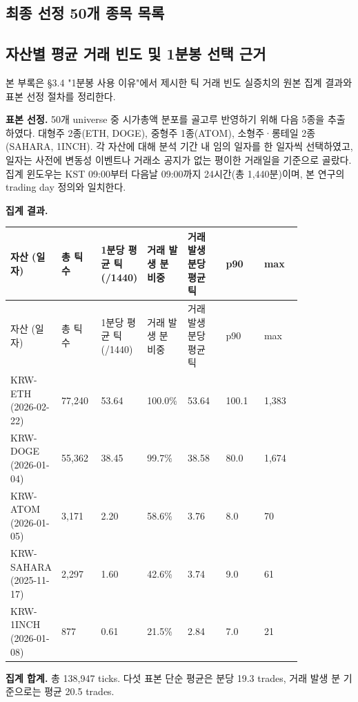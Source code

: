 \documentclass[12pt,a4paper]{article}
\begin{document}
\subsection{최종 선정 50개 종목 목록}


\subsection{자산별 평균 거래 빈도 및 1분봉 선택 근거}

본 부록은 \S{}3.4 "1분봉 사용 이유"에서 제시한 틱 거래 빈도 실증치의 원본 집계 결과와 표본 선정 절차를 정리한다.

\textbf{표본 선정.} 50개 universe 중 시가총액 분포를 골고루 반영하기 위해 다음 5종을 추출하였다. 대형주 2종(ETH, DOGE), 중형주 1종(ATOM), 소형주·롱테일 2종(SAHARA, 1INCH). 각 자산에 대해 분석 기간 내 임의 일자를 한 일자씩 선택하였고, 일자는 사전에 변동성 이벤트나 거래소 공지가 없는 평이한 거래일을 기준으로 골랐다. 집계 윈도우는 KST 09:00부터 다음날 09:00까지 24시간(총 1,440분)이며, 본 연구의 trading day 정의와 일치한다.

\textbf{집계 결과.}

\begin{center}
\scriptsize
\begin{longtable}{@{}lp{0.14\linewidth}p{0.14\linewidth}p{0.14\linewidth}p{0.14\linewidth}p{0.14\linewidth}p{0.14\linewidth}@{}}
\toprule
자산 (일자) & 총 틱 수 & 1분당 평균 틱 (/1440) & 거래 발생 분 비중 & 거래 발생 분당 평균 틱 & p90 & max \\
\midrule
\endfirsthead
\toprule
자산 (일자) & 총 틱 수 & 1분당 평균 틱 (/1440) & 거래 발생 분 비중 & 거래 발생 분당 평균 틱 & p90 & max \\
\midrule
\endhead
KRW-ETH (2026-02-22) & 77,240 & 53.64 & 100.0\% & 53.64 & 100.1 & 1,383 \\
KRW-DOGE (2026-01-04) & 55,362 & 38.45 & 99.7\% & 38.58 & 80.0 & 1,674 \\
KRW-ATOM (2026-01-05) & 3,171 & 2.20 & 58.6\% & 3.76 & 8.0 & 70 \\
KRW-SAHARA (2025-11-17) & 2,297 & 1.60 & 42.6\% & 3.74 & 9.0 & 61 \\
KRW-1INCH (2026-01-08) & 877 & 0.61 & 21.5\% & 2.84 & 7.0 & 21 \\
\bottomrule
\end{longtable}
\end{center}

\textbf{집계 합계.} 총 138,947 ticks. 다섯 표본 단순 평균은 분당 19.3 trades, 거래 발생 분 기준으로는 평균 20.5 trades.
\end{document}
